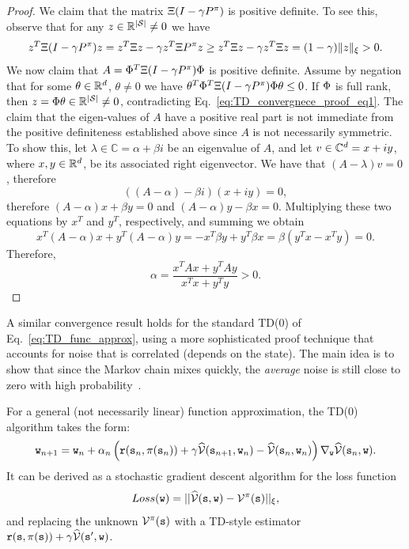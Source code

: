 \begin{enumerate}
\begin{proof}
We claim that the matrix $\Xi(I-\gamma P^\pi)$ is positive definite. To see this, observe that for any $z \in \mathbb{R}^{|\mathcal{S}|}\neq 0$ we have
\begin{equation}\label{eq:TD_convergnece_proof_eq1}
    z^T\Xi(I-\gamma P^\pi)z = z^T \Xi z - \gamma z^T \Xi P^\pi z \geq z^T \Xi z - \gamma z^T \Xi z = (1-\gamma) \|z\|_{\xi} > 0.
\end{equation}
We now claim that $A= \Phi^T \Xi(I-\gamma P^\pi) \Phi$ is positive definite. Assume by negation that for some $\theta \in \mathbb{R}^d$, $\theta\neq 0$ we have $\theta^T\Phi^T\Xi(I-\gamma P^\pi)\Phi\theta \leq 0$. If $\Phi$ is full rank, then $z = \Phi\theta \in \mathbb{R}^{|\mathcal{S}|} \neq 0$, contradicting Eq.~\eqref{eq:TD_convergnece_proof_eq1}. The claim that the eigen-values of $A$ have a positive real part is not immediate from the positive definiteness established above since $A$ is not necessarily symmetric. To show this, let $\lambda \in \mathbb{C} = \alpha + \beta i$ be an eigenvalue of $A$, and let $v \in \mathbb{C}^d = x + iy$, where $x,y\in \mathbb{R}^d$, be its associated right eigenvector. We have that $(A-\lambda)v = 0$, therefore
$$
((A - \alpha) -\beta i)(x + iy) = 0,
$$
therefore $(A-\alpha)x + \beta y = 0$ and $(A-\alpha)y - \beta x = 0$. Multiplying these two equations by $x^T$ and $y^T$, respectively, and summing we obtain
$$
x^T(A-\alpha)x + y^T(A-\alpha)y = - x^T\beta y + y^T\beta x = \beta(y^Tx - x^Ty) = 0.
$$
Therefore,
$$
\alpha = \frac{x^TAx + y^TAy}{x^Tx + y^Ty} > 0.
$$
\end{proof}

\begin{remark}
A similar convergence result holds for the standard TD(0) of Eq.~\ref{eq:TD_func_approx}, using a more sophisticated proof technique that accounts for noise that is correlated (depends on the state). The main idea is to show that since the Markov chain mixes quickly, the \textit{average} noise is still close to zero with high probability~\cite{TsitsiklisVR97}.
\end{remark}


\end{enumerate}
For a general (not necessarily linear) function approximation, the TD(0) algorithm takes the form:
\begin{equation*}
    {\tt w}_{n+1} = {\tt w}_n + \alpha_n \left( {\tt r}({\tt s}_n,\pi({\tt s}_n)) + \gamma\widehat{\mathcal{V}}({\tt s}_{n+1},{\tt w}_n) - \widehat{\mathcal{V}}({\tt s}_{n},{\tt w}_n) \right) \nabla_{{\tt w}} \widehat{\mathcal{V}}({\tt s}_n,{\tt w}).
\end{equation*}
It can be derived as a stochastic gradient descent algorithm for the loss function
\begin{equation*}
    Loss({\tt w}) = ||\widehat{\mathcal{V}}({\tt s},{\tt w}) - \mathcal{V}^\pi({\tt s})||_\xi,
\end{equation*}
and replacing the unknown $\mathcal{V}^\pi({\tt s})$ with a TD-style estimator ${\tt r}({\tt s},\pi({\tt s}))+\gamma \widehat{\mathcal{V}}({\tt s}',{\tt w})$.
%

